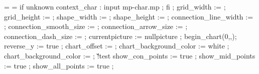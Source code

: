 {   \edef\@@FLOFrulethickness{\the\scratchdimen}%
   \scratchdimen=\@@FLOLrulethickness
   \edef\@@FLOLrulethickness{\the\scratchdimen}%
   \ifdim\@@FLOLradius<2.5\scratchdimen
     \scratchdimen=2.5\scratchdimen
     \edef\@@FLOLradius{\the\scratchdimen}%
     \ifdim\@@FLOLradius>\@@FLOWdx
       \scratchdimen=\@@FLOWdx
       \edef\@@FLOLradius{\the\scratchdimen}%
     \fi
     \ifdim\@@FLOLradius>\@@FLOWdy
       \scratchdimen=\@@FLOWdy
       \edef\@@FLOLradius{\the\scratchdimen}%
     \fi
   \else
     \scratchdimen=\@@FLOLradius
     \edef\@@FLOLradius{\the\scratchdimen}%
   \fi
   \processaction %
     [\@@FLOWoffset]
     [      \v!none=>\scratchdimen=-2.5\scratchdimen,
         \v!overlay=>\scratchdimen=-2.5\scratchdimen,
        \v!standard=>\scratchdimen=\scratchdimen,
         \s!unknown=>\scratchdimen=\@@FLOWoffset,
         \s!default=>\scratchdimen=-2.5\scratchdimen]%
   \edef\@@FLOW@@offset{\the\scratchdimen}%
   \forgetall
   \offinterlineskip
   \resetMPdrawing
   \doglobal\newcounter\FLOWcomment
   \startMPdrawing
     if unknown context_char : input mp-char.mp ; fi ;
     grid_width             := \FLOWgridwidth ;
     grid_height            := \FLOWgridheight ;
     shape_width            := \FLOWshapewidth ;
     shape_height           := \FLOWshapeheight ;
     connection_line_width  := \@@FLOLrulethickness ;
     connection_smooth_size := \@@FLOLradius ;
     connection_arrow_size  := \@@FLOLradius ;
     connection_dash_size   := \@@FLOLradius ;
     currentpicture := nullpicture ;
     begin_chart(0,\FLOWwidth,\FLOWheight);
     reverse_y := true ;
     chart_offset := \@@FLOW@@offset ;
   \stopMPdrawing
   \doifelsenothing\@@FLOWbackgroundcolor
     {\startMPdrawing
      chart_background_color := white ;
      \stopMPdrawing}
     {\startMPdrawing
      chart_background_color := \MPcolor{\@@FLOWbackgroundcolor} ;
      \stopMPdrawing}%
   \doif\@@FLOWoption\v!test
     {\startMPdrawing
        show_con_points := true ;
        show_mid_points := true ;
        show_all_points := true ;
      \stopMPdrawing}%
   \processaction %
     [\@@FLOWdot]
     [     \v!yes=>\startMPdrawing
                    show_con_points := true ;
                    show_mid_points := true ;
                    show_all_points := true ;
                  \stopMPdrawing,
      \s!unknown=>\startMPdrawing
                    show_\@@FLOWdot_points := true ;
                  \stopMPdrawing]%
\doglobal\newcounter\FLOWcomment
   \let\startFLOWcell\startFLOWcellB
   \resetFLOWlocation
   \processFLOWbuffer\currentFLOWnumber
\doglobal\newcounter\FLOWcomment
}
